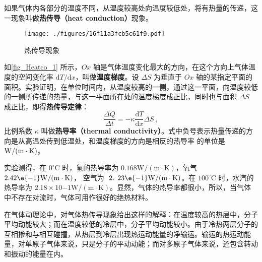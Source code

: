 
如果气体内各部分的温度不同，从温度较高处向温度较低处，将有热量的传递，这一现象叫做\textbf{热传导（heat conduction）}现象。

\begin{figure}[ht]
\centering
\texttt{[image: ./figures/16f11a3fcb5c61f9.pdf]}
\caption{热传导现象} \label{fig_Heatco_1}
\end{figure}

如\autoref{fig_Heatco_1} 所示，$Ox$ 轴是气体温度变化最大的方向，在这个方向上气体温度的空间变化率 $\mathrm dT/\mathrm dx$，叫做\textbf{温度梯度}。设 $\Delta S$ 为垂直于 $Ox $ 轴的某指定平面的面积。实验证明，在单位时间内，从温度较高的一侧，通过这一平面，向温度较低的一侧所传递的热量，与这一平面所在处的温度梯度成正比，同时也与面积 $\Delta S$ 成正比，即得\textbf{热传导定律}：
\begin{equation}
\frac{\Delta Q}{\Delta t}=-\kappa \frac{\mathrm{d} T}{\mathrm{d} x} \Delta S~,
\end{equation}
比例系数 $\kappa$ 叫做\textbf{热导率（thermal conductivity）}。式中负号表示热量传递的方向是从高温处传到低温处，和温度梯度的方向是相反的热导率
的单位是 $\rm W /(m \cdot K)$。

实验测得，在 $0^{\circ} \mathrm{C}$ 时，氢的热导率为 $0.168 \mathrm{W} /(\mathrm{m} \cdot \mathrm{K})$，氧气 $2.42\e{-1} \mathrm{W} /(\mathrm{m} \cdot \mathrm{K})$， 空气为 $\text { 2. } 23\e{-1} \mathrm{W} /(\mathrm{m} \cdot \mathrm{K})$。在 $100^{\circ} \mathrm{C}$ 时，水汽的热导率为 $2. 18\times  10{-1}\mathrm{W} /(\mathrm{m} \cdot \mathrm{K})$。显然，气体的热导率都很小，所以，当气体中不存在对流时，气体可用作很好的绝热材料。

在气体动理论中，对气体热传导现象给出这样的解释：在温度较高的热层中，分子平均动能较大；而在温度较低的冷层中，分子平均动能较小。由于冷热两层分子的互相掺和与相互碰撞，从热层到冷层出现热运动能量的净输运。输运的热运动能量，对单原子气体来说，只是分子的平动动能；而对多原子气体来说，还包含转动和振动的能量在内。